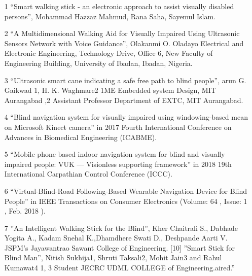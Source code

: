 \begin{itemize}

\item [1] “Smart walking stick - an electronic approach to assist visually disabled persons”, Mohammad Hazzaz Mahmud, Rana Saha, Sayemul Islam. 

\item [2] “A Multidimensional Walking Aid for Visually Impaired Using Ultrasonic Sensors Network with Voice Guidance”, Olakanmi O. Oladayo Electrical and Electronic Engineering, Technology Drive, Office 6, New Faculty of Engineering Building, University of Ibadan, Ibadan, Nigeria.

\item [3] “Ultrasonic smart cane indicating a safe free path to blind people”, arun G. Gaikwad 1, H. K. Waghmare2 1ME Embedded system Design, MIT Aurangabad ,2 Assistant Professor Department of EXTC, MIT Aurangabad.

\item [4] “Blind navigation system for visually impaired using windowing-based mean on Microsoft Kinect camera” in 2017 Fourth International Conference on Advances in Biomedical Engineering (ICABME).

\item [5] “Mobile phone based indoor navigation system for blind and visually impaired people: VUK — Visionless supporting framework” in 2018 19th International Carpathian Control Conference (ICCC).

\item [6] “Virtual-Blind-Road Following-Based Wearable Navigation Device for Blind People” in IEEE Transactions on Consumer Electronics (Volume: 64 , Issue: 1 , Feb. 2018 ).

\item  [7] ”An Intelligent Walking Stick for the Blind”, Kher Chaitrali S., Dabhade Yogita A., Kadam Snehal K.,Dhamdhere Swati D., Deshpande Aarti V. JSPM’s Jayawantrao Sawant College of Engineering. [10] ”Smart Stick for Blind Man”, Nitish Sukhija1, Shruti Taksali2, Mohit Jain3 and Rahul Kumawat4 1, 3 Student JECRC UDML COLLEGE of Engineering.aired.” 

\end{itemize}



